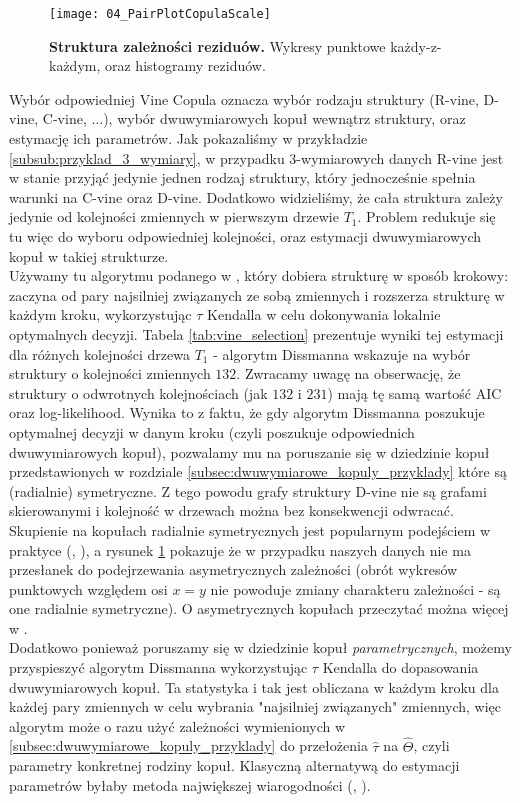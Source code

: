 \begin{figure}[h]
	\centering
	\texttt{[image: 04\_PairPlotCopulaScale]}
	\caption{\textbf{Struktura zależności reziduów.} Wykresy punktowe każdy-z-każdym, oraz histogramy reziduów. \label{fig:pair_copulas}}
\end{figure}

Wybór odpowiedniej Vine Copula oznacza wybór rodzaju struktury (R-vine, D-vine, C-vine, $\dots$), wybór dwuwymiarowych kopuł wewnątrz struktury, oraz estymację ich parametrów. Jak pokazaliśmy w przykładzie \ref{subsub:przyklad_3_wymiary}, w przypadku $3$-wymiarowych danych R-vine jest w stanie przyjąć jedynie jednen rodzaj struktury, który jednocześnie spełnia warunki na C-vine oraz D-vine. Dodatkowo widzieliśmy, że cała struktura zależy jedynie od kolejności zmiennych w pierwszym drzewie $T_1$.  Problem redukuje się tu więc do wyboru odpowiedniej kolejności, oraz estymacji dwuwymiarowych kopuł w takiej strukturze.\\
Używamy tu algorytmu podanego w \cite{Dissmann_Vines}, który dobiera strukturę w sposób krokowy: zaczyna od pary najsilniej związanych ze sobą zmiennych i rozszerza strukturę w każdym kroku, wykorzystując $\tau$ Kendalla w celu dokonywania lokalnie optymalnych decyzji. Tabela \ref{tab:vine_selection} prezentuje wyniki tej estymacji dla różnych kolejności drzewa $T_1$ - algorytm Dissmanna wskazuje na wybór struktury o kolejności zmiennych $132$. Zwracamy uwagę na obserwację, że struktury o odwrotnych kolejnościach (jak $132$ i $231$) mają tę samą wartość AIC oraz log-likelihood. Wynika to z faktu, że gdy algorytm Dissmanna poszukuje optymalnej decyzji w danym kroku (czyli poszukuje odpowiednich dwuwymiarowych kopuł), pozwalamy mu na poruszanie się w dziedzinie kopuł przedstawionych w rozdziale \ref{subsec:dwuwymiarowe_kopuly_przyklady} które są (radialnie) symetryczne. Z tego powodu grafy struktury D-vine nie są grafami skierowanymi i kolejność w drzewach można bez konsekwencji odwracać. Skupienie na kopułach radialnie symetrycznych jest popularnym podejściem w praktyce (\cite{Cherubini_Copula_Methods_in_Finance}, \cite{Czado_Vine_Copulas}), a rysunek \ref{fig:pair_copulas} pokazuje że w przypadku naszych danych nie ma przesłanek do podejrzewania asymetrycznych zależności (obrót wykresów punktowych względem osi $x=y$ nie powoduje zmiany charakteru zależności - są one radialnie symetryczne). O asymetrycznych kopułach przeczytać można więcej w \cite{BedfordCooke2002}.\\
Dodatkowo ponieważ poruszamy się w dziedzinie kopuł \emph{parametrycznych}, możemy przyspieszyć algorytm Dissmanna wykorzystując $\tau$ Kendalla do dopasowania dwuwymiarowych kopuł. Ta statystyka i tak jest obliczana w każdym kroku dla każdej pary zmiennych w celu wybrania "najsilniej związanych" zmiennych, więc algorytm może o razu użyć zależności wymienionych w \ref{subsec:dwuwymiarowe_kopuly_przyklady} do przełożenia $\hat{\tau}$ na $\hat{\Theta}$, czyli parametry konkretnej rodziny kopuł. Klasyczną alternatywą do estymacji parametrów byłaby metoda największej wiarogodności (\cite{BedfordCooke2002}, \cite{Czado_Vine_Copulas}).\\

